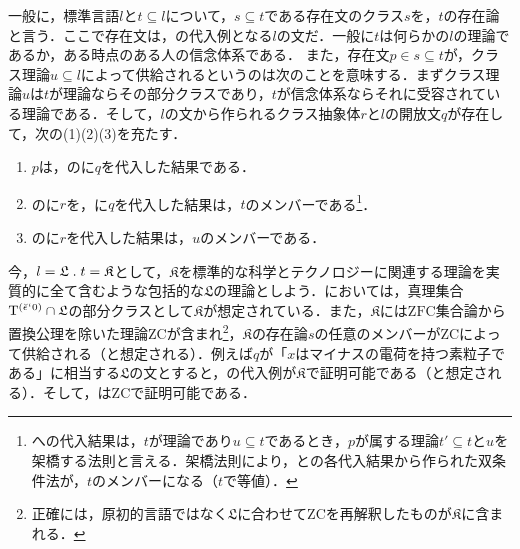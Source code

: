 一般に，標準言語$l$と$t\subseteq l$について，$s\subseteq t$である存在文のクラス$s$を，$t$の存在論と言う．ここで存在文は，の代入例となる$l$の文だ．一般に$t$は何らかの$l$の理論であるか，ある時点のある人の信念体系である．
また，存在文$p\in s\subseteq t$が，クラス理論$u\subseteq l$によって供給されるというのは次のことを意味する．まずクラス理論$u$は$t$が理論ならその部分クラスであり，$t$が信念体系ならそれに受容されている理論である．そして，$l$の文から作られるクラス抽象体$r$と$l$の開放文$q$が存在して，次の(1)(2)(3)を充たす．
\begin{enumerate}[label=(\arabic*)]
    \item $p$は，のに$q$を代入した結果である．
    \item {}の\kagi{$ \alpha $}に$r$を，に$q$を代入した結果は，$t$のメンバーである\footnote{
        への代入結果は，$t$が理論であり$u\subseteq t$であるとき，$p$が属する理論$t'\subseteq t$と$u$を架橋する法則と言える．架橋法則により，との各代入結果から作られた双条件法が，$t$のメンバーになる（$t$で等値）．
    }．
    \item {}の\kagi{$ \alpha $}に$r$を代入した結果は，$u$のメンバーである．
\end{enumerate}

今，$ l = \mathfrak{L}\con{1}t = \mathfrak{K} $として，$\mathfrak{K}$を標準的な科学とテクノロジーに関連する理論を実質的に全て含むような包括的な$\mathfrak{L}$の理論としよう．においては，真理集合$\mathrm{T}^{(\breve{\epsilon}{\mspace{1mu}{`}\mspace{1mu}} 0)}\cap\mathfrak{L}$の部分クラスとして$\mathfrak{K}$が想定されている．また，$\mathfrak{K}$には$\mathrm{ZFC}$集合論から置換公理を除いた理論ZCが含まれ\footnote{正確には，原初的言語ではなく$\mathfrak{L}$に合わせてZCを再解釈したものが$\mathfrak{K}$に含まれる．}，$\mathfrak{K}$の存在論$s$の任意のメンバーがZCによって供給される（と想定される）．例えば$q$が「$x$はマイナスの電荷を持つ素粒子である」に相当する$\mathfrak{L}$の文とすると，の代入例が$\mathfrak{K}$で証明可能である（と想定される）．そして，はZCで証明可能である．

